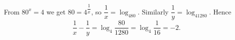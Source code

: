 From $80^x=4$ we get $80=4^{\dfrac1x}$, so $\dfrac1x=\log_480$. Similarly $\dfrac1y=\log_41280$. Hence
\[\dfrac1x-\dfrac1y=\log_4\dfrac{80}{1280}=\log_4\dfrac1{16}=\boxed{-2}.\]
